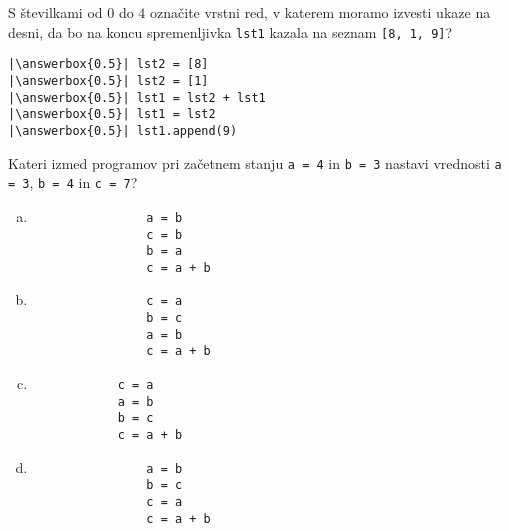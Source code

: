 \documentclass[arhiv, 10pt]{../izpit}
\newcommand{\inlinepy}[1]{\texttt{#1}}
\newcommand{\answerbox}[1]{\framebox{\vphantom{\large M}\hspace{#1cm}}}
\begin{document}
        \naloga*
        \begin{multicols}{2}
        \noindent 
        S številkami od $0$ do $4$ označite vrstni red, v katerem moramo izvesti ukaze na desni, da bo na koncu spremenljivka \inlinepy{lst1} kazala na seznam \inlinepy{[8, 1, 9]}?
    
        \columnbreak
        \noindent
        \begin{verbatim}
|\answerbox{0.5}| lst2 = [8]
|\answerbox{0.5}| lst2 = [1]
|\answerbox{0.5}| lst1 = lst2 + lst1
|\answerbox{0.5}| lst1 = lst2
|\answerbox{0.5}| lst1.append(9)

        \end{verbatim}
        \end{multicols}
    
            
        \naloga*
        
        Kateri izmed programov pri začetnem stanju
            \inlinepy{a = 4} in
            \inlinepy{b = 3}
        nastavi vrednosti
            \inlinepy{a = 3},
            \inlinepy{b = 4} in
            \inlinepy{c = 7}?
    
        \begin{multicols}{4}
        \begin{enumerate}[(a)]
\item 
                \begin{verbatim}
                a = b
                c = b
                b = a
                c = a + b
                \end{verbatim}
            
\item 
                \begin{verbatim}
                c = a
                b = c
                a = b
                c = a + b
                \end{verbatim}
            
\item 
            \begin{verbatim}
            c = a
            a = b
            b = c
            c = a + b
            \end{verbatim}
        
\item 
                \begin{verbatim}
                a = b
                b = c
                c = a
                c = a + b
                \end{verbatim}
            
\end{enumerate}

        \end{multicols}
    
\end{document}
